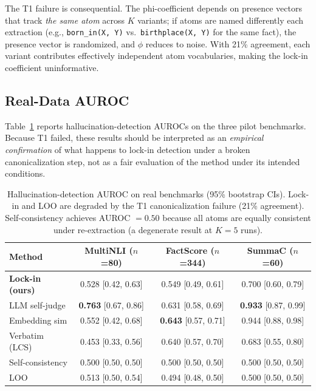 \documentclass[11pt,letterpaper]{article}
\begin{document}
The T1 failure is consequential. The phi-coefficient depends on presence vectors that track \emph{the same atom}
across $K$ variants; if atoms are named differently each extraction (e.g., \texttt{born\_in(X,~Y)} vs.\
\texttt{birthplace(X,~Y)} for the same fact), the presence vector is randomized, and $\phi$ reduces to noise. With
21\% agreement, each variant contributes effectively independent atom vocabularies, making the lock-in coefficient
uninformative.

\subsection{Real-Data AUROC}

Table~\ref{tab:real} reports hallucination-detection AUROCs on the three pilot benchmarks. Because T1 failed, these
results should be interpreted as an \emph{empirical confirmation} of what happens to lock-in detection under a broken
canonicalization step, not as a fair evaluation of the method under its intended conditions.

\begin{table}[!htbp]
  \centering
  \caption{Hallucination-detection AUROC on real benchmarks (95\% bootstrap CIs). Lock-in and LOO are degraded by the
  T1 canonicalization failure (21\% agreement). Self-consistency achieves AUROC $= 0.50$ because all atoms are equally
  consistent under re-extraction (a degenerate result at $K=5$ runs).}
  \label{tab:real}
  \begin{tabular}{lccc}
    \toprule
    Method & MultiNLI ($n$=80) & FactScore ($n$=344) & SummaC ($n$=60) \\
    \midrule
    \textbf{Lock-in (ours)} & 0.528 [0.42, 0.63] & 0.549 [0.49, 0.61] & 0.700 [0.60, 0.79] \\
    LLM self-judge          & \textbf{0.763} [0.67, 0.86] & 0.631 [0.58, 0.69] & \textbf{0.933} [0.87, 0.99] \\
    Embedding sim           & 0.552 [0.42, 0.68] & \textbf{0.643} [0.57, 0.71] & 0.944 [0.88, 0.98] \\
    Verbatim (LCS)          & 0.453 [0.33, 0.56] & 0.640 [0.57, 0.70] & 0.683 [0.55, 0.80] \\
    Self-consistency        & 0.500 [0.50, 0.50] & 0.500 [0.50, 0.50] & 0.500 [0.50, 0.50] \\
    LOO                     & 0.513 [0.50, 0.54] & 0.494 [0.48, 0.50] & 0.500 [0.50, 0.50] \\
    \bottomrule
  \end{tabular}
\end{table}
\end{document}
